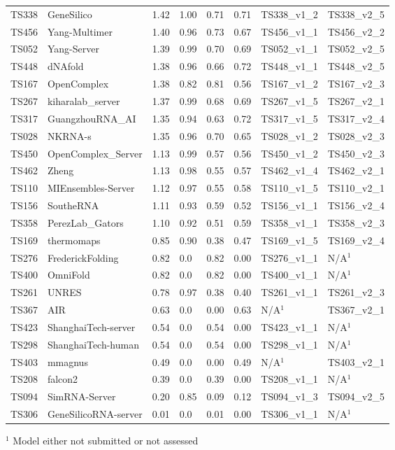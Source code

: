 \begin{table}[ht]
{\begin{tabular}{llllllll}
TS338 & GeneSilico & 1.42 & 1.00 & 0.71 & 0.71 & TS338\_v1\_2 & TS338\_v2\_5 \\ 
TS456 & Yang-Multimer & 1.40 & 0.96 & 0.73 & 0.67 & TS456\_v1\_1 & TS456\_v2\_2 \\ 
TS052 & Yang-Server & 1.39 & 0.99 & 0.70 & 0.69 & TS052\_v1\_1 & TS052\_v2\_5 \\ 
TS448 & dNAfold & 1.38 & 0.96 & 0.66 & 0.72 & TS448\_v1\_1 & TS448\_v2\_5 \\ 
TS167 & OpenComplex & 1.38 & 0.82 & 0.81 & 0.56 & TS167\_v1\_2 & TS167\_v2\_3 \\ 
TS267 & kiharalab\_server & 1.37 & 0.99 & 0.68 & 0.69 & TS267\_v1\_5 & TS267\_v2\_1 \\ 
TS317 & GuangzhouRNA\_AI & 1.35 & 0.94 & 0.63 & 0.72 & TS317\_v1\_5 & TS317\_v2\_4 \\ 
TS028 & NKRNA-s & 1.35 & 0.96 & 0.70 & 0.65 & TS028\_v1\_2 & TS028\_v2\_3 \\ 
TS450 & OpenComplex\_Server & 1.13 & 0.99 & 0.57 & 0.56 & TS450\_v1\_2 & TS450\_v2\_3 \\ 
TS462 & Zheng & 1.13 & 0.98 & 0.55 & 0.57 & TS462\_v1\_4 & TS462\_v2\_1 \\ 
TS110 & MIEnsembles-Server & 1.12 & 0.97 & 0.55 & 0.58 & TS110\_v1\_5 & TS110\_v2\_1 \\ 
TS156 & SoutheRNA & 1.11 & 0.93 & 0.59 & 0.52 & TS156\_v1\_1 & TS156\_v2\_4 \\ 
TS358 & PerezLab\_Gators & 1.10 & 0.92 & 0.51 & 0.59 & TS358\_v1\_1 & TS358\_v2\_3 \\ 
TS169 & thermomaps & 0.85 & 0.90 & 0.38 & 0.47 & TS169\_v1\_5 & TS169\_v2\_4 \\ 
TS276 & FrederickFolding & 0.82 & 0.0 & 0.82 & 0.00 & TS276\_v1\_1 & N/A$^{1}$ \\ 
TS400 & OmniFold & 0.82 & 0.0 & 0.82 & 0.00 & TS400\_v1\_1 & N/A$^{1}$ \\ 
TS261 & UNRES & 0.78 & 0.97 & 0.38 & 0.40 & TS261\_v1\_1 & TS261\_v2\_3 \\ 
TS367 & AIR & 0.63 & 0.0 & 0.00 & 0.63 & N/A$^{1}$ & TS367\_v2\_1 \\ 
TS423 & ShanghaiTech-server & 0.54 & 0.0 & 0.54 & 0.00 & TS423\_v1\_1 & N/A$^{1}$ \\ 
TS298 & ShanghaiTech-human & 0.54 & 0.0 & 0.54 & 0.00 & TS298\_v1\_1 & N/A$^{1}$ \\ 
TS403 & mmagnus & 0.49 & 0.0 & 0.00 & 0.49 & N/A$^{1}$ & TS403\_v2\_1 \\ 
TS208 & falcon2 & 0.39 & 0.0 & 0.39 & 0.00 & TS208\_v1\_1 & N/A$^{1}$ \\ 
TS094 & SimRNA-Server & 0.20 & 0.85 & 0.09 & 0.12 & TS094\_v1\_3 & TS094\_v2\_5 \\ 
TS306 & GeneSilicoRNA-server & 0.01 & 0.0 & 0.01 & 0.00 & TS306\_v1\_1 & N/A$^{1}$ \\ 
\bottomrule
\end{tabular}%
}
\begin{flushleft}\footnotesize $^{1}$ Model either not submitted or not assessed\end{flushleft}
\end{table}
